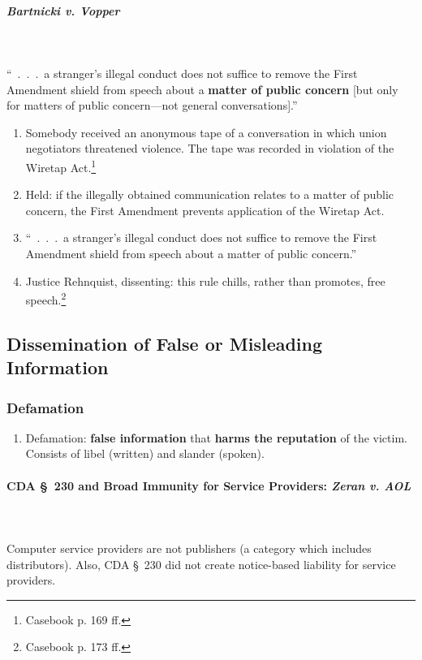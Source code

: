 \paragraph{\emph{Bartnicki v. Vopper}}
~\\\\
``~.~.~.~a stranger's illegal conduct does not suffice to remove the First 
Amendment shield from speech about a \textbf{matter of public concern} [but only 
for matters of public concern---not general conversations].''

\begin{enumerate}
    \item Somebody received an anonymous tape of a conversation in which union 
    negotiators threatened violence. The tape was recorded in violation of the 
    Wiretap Act.\footnote{Casebook p. 169 ff.}
    \item Held: if the illegally obtained communication relates to a matter of 
    public concern, the First Amendment prevents application of the Wiretap Act.  
    \item ``~.~.~.~a stranger's illegal conduct does not suffice to remove the 
    First Amendment shield from speech about a matter of public concern.''
    \item Justice Rehnquist, dissenting: this rule chills, rather than promotes, 
    free speech.\footnote{Casebook p. 173 ff.}
\end{enumerate}

\subsection{Dissemination of False or Misleading Information}

\subsubsection{Defamation}

\begin{enumerate}
    \item Defamation: \textbf{false information} that \textbf{harms the 
    reputation} of the victim. Consists of libel (written) and slander (spoken).
\end{enumerate}

\paragraph{CDA \S\ 230 and Broad Immunity for Service Providers: \emph{Zeran v.  
AOL}}
~\\\\
Computer service providers are not publishers (a category which includes 
distributors). Also, CDA \S\ 230 did not create notice-based liability for 
service providers.

